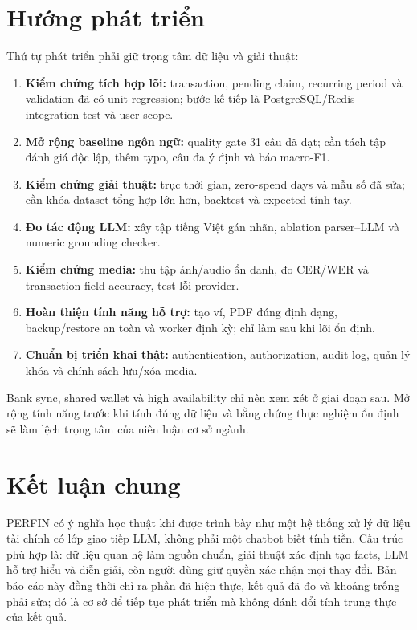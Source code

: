 \section{Hướng phát triển}

Thứ tự phát triển phải giữ trọng tâm dữ liệu và giải thuật:

\begin{enumerate}
  \item \textbf{Kiểm chứng tích hợp lõi:} transaction, pending claim, recurring period và validation đã có unit regression; bước kế tiếp là PostgreSQL/Redis integration test và user scope.
  \item \textbf{Mở rộng baseline ngôn ngữ:} quality gate 31 câu đã đạt; cần tách tập đánh giá độc lập, thêm typo, câu đa ý định và báo macro-F1.
  \item \textbf{Kiểm chứng giải thuật:} trục thời gian, zero-spend days và mẫu số đã sửa; cần khóa dataset tổng hợp lớn hơn, backtest và expected tính tay.
  \item \textbf{Đo tác động LLM:} xây tập tiếng Việt gán nhãn, ablation parser--LLM và numeric grounding checker.
  \item \textbf{Kiểm chứng media:} thu tập ảnh/audio ẩn danh, đo CER/WER và transaction-field accuracy, test lỗi provider.
  \item \textbf{Hoàn thiện tính năng hỗ trợ:} tạo ví, PDF đúng định dạng, backup/restore an toàn và worker định kỳ; chỉ làm sau khi lõi ổn định.
  \item \textbf{Chuẩn bị triển khai thật:} authentication, authorization, audit log, quản lý khóa và chính sách lưu/xóa media.
\end{enumerate}

Bank sync, shared wallet và high availability chỉ nên xem xét ở giai đoạn sau. Mở rộng tính năng trước khi tính đúng dữ liệu và bằng chứng thực nghiệm ổn định sẽ làm lệch trọng tâm của niên luận cơ sở ngành.

\section{Kết luận chung}

PERFIN có ý nghĩa học thuật khi được trình bày như một hệ thống xử lý dữ liệu tài chính có lớp giao tiếp LLM, không phải một chatbot biết tính tiền. Cấu trúc phù hợp là: dữ liệu quan hệ làm nguồn chuẩn, giải thuật xác định tạo facts, LLM hỗ trợ hiểu và diễn giải, còn người dùng giữ quyền xác nhận mọi thay đổi. Bản báo cáo này đồng thời chỉ ra phần đã hiện thực, kết quả đã đo và khoảng trống phải sửa; đó là cơ sở để tiếp tục phát triển mà không đánh đổi tính trung thực của kết quả.
